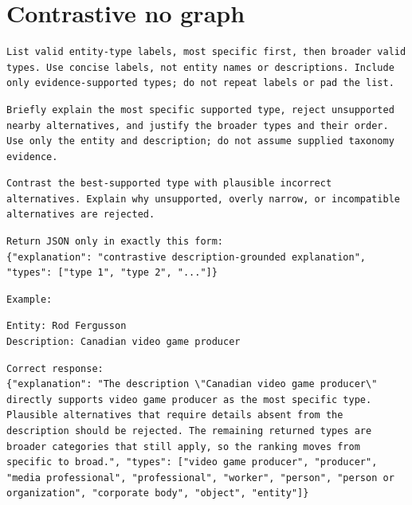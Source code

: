 \section{Contrastive no graph}

\begin{Verbatim}[fontsize=\footnotesize,breaklines=true,breakanywhere=true]
List valid entity-type labels, most specific first, then broader valid types. Use concise labels, not entity names or descriptions. Include only evidence-supported types; do not repeat labels or pad the list.
\end{Verbatim}

\begin{Verbatim}[fontsize=\footnotesize,breaklines=true,breakanywhere=true]
Briefly explain the most specific supported type, reject unsupported nearby alternatives, and justify the broader types and their order. Use only the entity and description; do not assume supplied taxonomy evidence.
\end{Verbatim}

\begin{Verbatim}[fontsize=\footnotesize,breaklines=true,breakanywhere=true]
Contrast the best-supported type with plausible incorrect alternatives. Explain why unsupported, overly narrow, or incompatible alternatives are rejected.
\end{Verbatim}

\begin{Verbatim}[fontsize=\footnotesize,breaklines=true,breakanywhere=true]
Return JSON only in exactly this form:
{"explanation": "contrastive description-grounded explanation", "types": ["type 1", "type 2", "..."]}
\end{Verbatim}

\begin{Verbatim}[fontsize=\footnotesize,breaklines=true,breakanywhere=true]
Example:
\end{Verbatim}

\begin{Verbatim}[fontsize=\footnotesize,breaklines=true,breakanywhere=true]
Entity: Rod Fergusson
Description: Canadian video game producer
\end{Verbatim}

\begin{Verbatim}[fontsize=\footnotesize,breaklines=true,breakanywhere=true]
Correct response:
{"explanation": "The description \"Canadian video game producer\" directly supports video game producer as the most specific type. Plausible alternatives that require details absent from the description should be rejected. The remaining returned types are broader categories that still apply, so the ranking moves from specific to broad.", "types": ["video game producer", "producer", "media professional", "professional", "worker", "person", "person or organization", "corporate body", "object", "entity"]}
\end{Verbatim}

